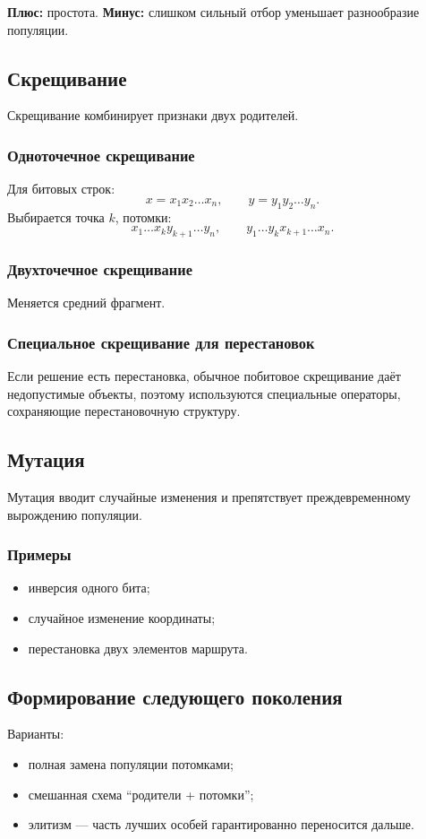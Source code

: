 \documentclass[12pt,a4paper]{article}
\theoremstyle{definition}
\theoremstyle{plain}
\begin{document}
\textbf{Плюс:} простота.
\textbf{Минус:} слишком сильный отбор уменьшает разнообразие популяции.

\subsection{Скрещивание}
Скрещивание комбинирует признаки двух родителей.

\subsubsection{Одноточечное скрещивание}
Для битовых строк:
\[
x=x_1x_2\ldots x_n,\qquad y=y_1y_2\ldots y_n.
\]
Выбирается точка $k$, потомки:
\[
x_1\ldots x_k y_{k+1}\ldots y_n,
\qquad
y_1\ldots y_k x_{k+1}\ldots x_n.
\]

\subsubsection{Двухточечное скрещивание}
Меняется средний фрагмент.

\subsubsection{Специальное скрещивание для перестановок}
Если решение есть перестановка, обычное побитовое скрещивание даёт недопустимые объекты, поэтому используются специальные операторы, сохраняющие перестановочную структуру.

\subsection{Мутация}
Мутация вводит случайные изменения и препятствует преждевременному вырождению популяции.

\subsubsection{Примеры}
\begin{itemize}
\item инверсия одного бита;
\item случайное изменение координаты;
\item перестановка двух элементов маршрута.
\end{itemize}

\subsection{Формирование следующего поколения}
Варианты:
\begin{itemize}
\item полная замена популяции потомками;
\item смешанная схема ``родители + потомки'';
\item элитизм --- часть лучших особей гарантированно переносится дальше.
\end{itemize}
\end{document}
